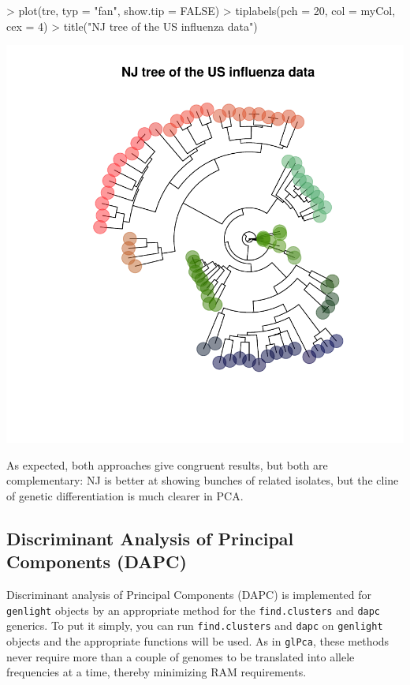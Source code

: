 \documentclass{article}
\begin{document}
\begin{Schunk}
\begin{Sinput}
> plot(tre, typ = "fan", show.tip = FALSE)
> tiplabels(pch = 20, col = myCol, cex = 4)
> title("NJ tree of the US influenza data")
\end{Sinput}
\end{Schunk}
\includegraphics{figs/genomics-056}

\noindent As expected, both approaches give congruent results, but both are complementary: NJ is
better at showing bunches of related isolates, but the cline of genetic differentiation is much
clearer in PCA.




\subsection{Discriminant Analysis of Principal Components (DAPC)}
Discriminant analysis of Principal Components (DAPC) is implemented for \texttt{genlight} objects by
an appropriate method for the \texttt{find.clusters} and \texttt{dapc} generics.
To put it simply, you can run \texttt{find.clusters} and \texttt{dapc} on \texttt{genlight} objects and the appropriate
functions will be used.
As in \texttt{glPca}, these methods never require more than a couple of genomes to be translated into
allele frequencies at a time, thereby minimizing RAM requirements.
\\
\end{document}
